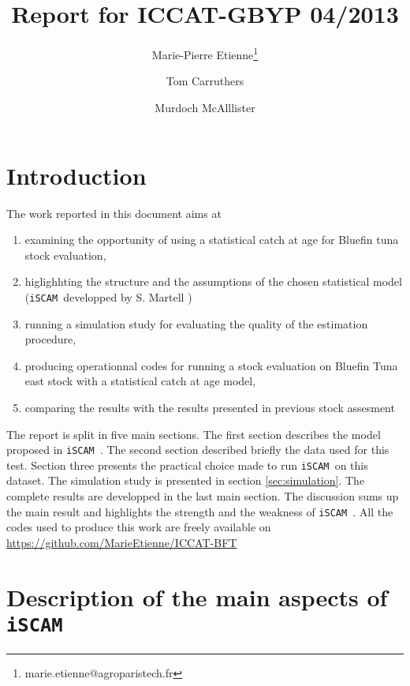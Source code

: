 \documentclass[a4paper]{article}\usepackage{graphicx, color}
\title{Report for ICCAT-GBYP 04/2013}
\author[1]{Marie-Pierre Etienne\thanks{marie.etienne@agroparistech.fr}}
\author[2]{Tom Carruthers }
\author[2]{Murdoch McAlllister}
\affil[1]{AgroParisTech}
\affil[2]{UBC}
\newcommand{\iscam}{\texttt{iSCAM }}
\begin{document}
\graphicspath{{/home/metienne/ICCAT/ICCAT-BFT/Report/figure}}
 






\maketitle
\tableofcontents
\clearpage

\section{Introduction}

The work reported in this document aims at 
\begin{enumerate}
 \item examining the opportunity of using a statistical catch at age for Bluefin tuna stock evaluation,
 \item higlighhting the structure and the assumptions of the chosen statistical model (\iscam developped by S. Martell \cite{Martell12})
 \item running a simulation study for evaluating the quality of the estimation procedure,
  \item producing operationnal codes for running a stock evaluation on Bluefin Tuna east stock with a statistical catch at age model,
  \item comparing the results with the results presented in previous stock assesment
  \end{enumerate}
  
The report is split in five main sections. The first section describes the model proposed in \iscam. The second section described briefly the data used  for this test.
Section three presents the practical choice made to run \iscam on this dataset. The simulation study is presented in section \ref{sec:simulation}.
The complete results are developped in the last main section. The discussion sums up the main result and highlights the strength and the weakness of \iscam.
All the codes used to produce this work are freely available on \url{https://github.com/MarieEtienne/ICCAT-BFT}

\section{Description of the main aspects of \iscam }


\clearpage\clearpage
\end{document}
